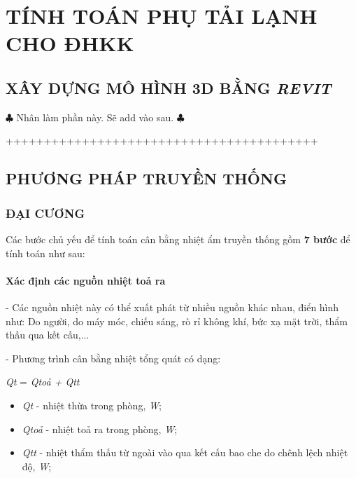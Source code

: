 \newpage
{}

\newpage
\chapter{\textbf{TÍNH TOÁN PHỤ TẢI LẠNH CHO ĐHKK}}
\newpage

\section{XÂY DỰNG MÔ HÌNH 3D BẰNG \emph{REVIT}}
\hspace{1cm}$ \clubsuit $ Nhân làm phần này. Sẽ add vào sau. $ \clubsuit $

+++++++++++++++++++++++++++++++++++++++++

\section{PHƯƠNG PHÁP TRUYỀN THỐNG}
\subsection{ĐẠI CƯƠNG}
\hspace{1cm}Các bước chủ yếu để tính toán cân bằng nhiệt ẩm truyền thống gồm \textbf{7 bước} để tính toán như sau:
\subsubsection{Xác định các nguồn nhiệt toả ra}
\hspace{1cm}- Các nguồn nhiệt này có thể xuất phát từ nhiều nguồn khác nhau, điển hình như: Do người, do máy móc, chiếu sáng, rò rỉ không khí, bức xạ mặt trời, thẩm thấu qua kết cấu,...

- Phương trình cân bằng nhiệt tổng quát có dạng:

\begin{center}
	\textit{Q{\footnotesize t}} = \textit{Q{\footnotesize toả} + Q{\footnotesize tt}}
\end{center}

\begin{itemize}[leftmargin = 3cm, label = $\star$]
	\item \textit{Q{\footnotesize t}} - nhiệt thừa trong phòng, \textit{W};
	
	\item \textit{Q{\footnotesize toả}} - nhiệt toả ra trong phòng, \textit{W};
	
	\item \textit{Q{\footnotesize tt}} - nhiệt thẩm thấu từ ngoài vào qua kết cấu bao che do chênh lệch nhiệt độ, \textit{W};
\end{itemize}


